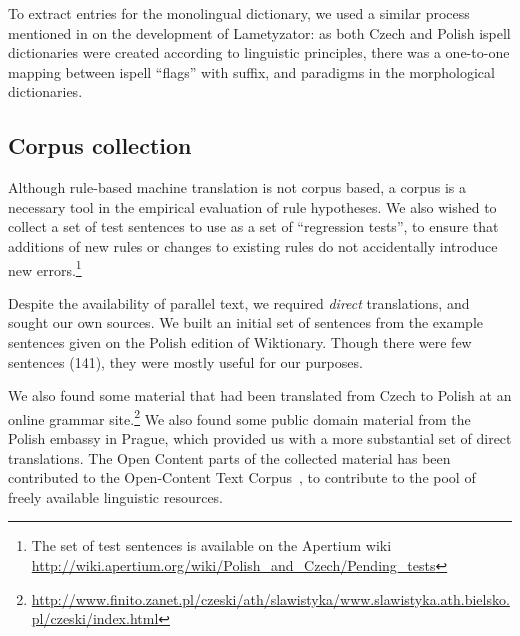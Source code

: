 \documentclass[11pt]{article}
\begin{document}
To extract entries for the monolingual dictionary, we used a similar process mentioned in \cite{Weiss05}
on the development of Lametyzator:
as both Czech and Polish ispell dictionaries were created according to linguistic principles, there 
was a one-to-one mapping between ispell ``flags'' with suffix, and paradigms in the 
morphological dictionaries. %



\subsection{Corpus collection}
\label{sect:corpus}

Although rule-based machine translation is not corpus based, a corpus is a 
necessary tool in the empirical evaluation of rule hypotheses. We also
wished to collect a set of test sentences to use as a set of ``regression 
tests'', to ensure that additions of new rules or changes to existing rules
do not accidentally introduce new errors.\footnote{The set of test sentences is available on the
Apertium wiki \url{http://wiki.apertium.org/wiki/Polish_and_Czech/Pending_tests}}

Despite the availability of parallel text, we required \textit{direct} translations,
and sought our own sources.
We built an initial set of sentences from the example sentences given on
the Polish edition of Wiktionary. Though there were few sentences (141), they
were mostly useful for our purposes.

We also found some material that had been translated from Czech to Polish
at an online grammar 
site.\footnote{\url{http://www.finito.zanet.pl/czeski/ath/slawistyka/www.slawistyka.ath.bielsko.pl/czeski/index.html}}
We also found some public domain material from
the Polish embassy in Prague, which provided us with a more substantial 
set of direct translations. The Open Content parts of the collected
material has been contributed to the Open-Content Text Corpus~\citep{Banski10}, 
to contribute to the pool of freely available linguistic resources.
\end{document}

